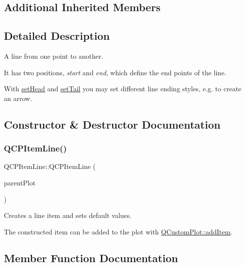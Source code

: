 \subsection*{Additional Inherited Members}


\subsection{Detailed Description}
A line from one point to another. 

 It has two positions, {\itshape start} and {\itshape end}, which define the end points of the line.

With \mbox{\hyperlink{class_q_c_p_item_line_aebf3d687114d584e0459db6759e2c3c3}{set\+Head}} and \mbox{\hyperlink{class_q_c_p_item_line_ac264222c3297a7efe33df9345c811a5f}{set\+Tail}} you may set different line ending styles, e.\+g. to create an arrow. 

\subsection{Constructor \& Destructor Documentation}
\mbox{\label{class_q_c_p_item_line_a17804b7f64961c6accf25b61e85142e3}} 
\subsubsection{\texorpdfstring{Q\+C\+P\+Item\+Line()}{QCPItemLine()}}
{\footnotesize\ttfamily Q\+C\+P\+Item\+Line\+::\+Q\+C\+P\+Item\+Line (\begin{DoxyParamCaption}\item[{\mbox{\hyperlink{class_q_custom_plot}{Q\+Custom\+Plot}} $\ast$}]{parent\+Plot }\end{DoxyParamCaption})}

Creates a line item and sets default values.

The constructed item can be added to the plot with \mbox{\hyperlink{class_q_custom_plot_aa500620379262321685cb7a7674cbd2a}{Q\+Custom\+Plot\+::add\+Item}}. 

\subsection{Member Function Documentation}
\mbox{\label{class_q_c_p_item_line_ae6cc5183f568e5fa9d7827abe4d405b5}} 
